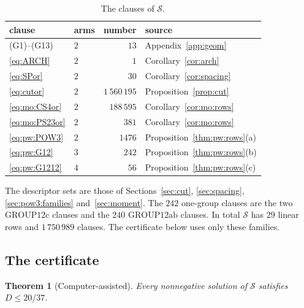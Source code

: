 \documentclass{amsart}
\newtheorem{theorem}{Theorem}
\theoremstyle{definition}
\theoremstyle{plain}
\numberwithin{equation}{section}
\numberwithin{table}{section}
\begin{document}
\begin{table}[ht]
\centering\small
\caption{The clauses of $\mathcal S$.}\label{tab:sys}
\begin{tabular}{@{}llrl@{}}
\hline clause & arms & number & source\\\hline
(G1)--(G13) & $2$ & $13$ & Appendix~\ref{app:geom}\\
\eqref{eq:ARCH} & $2$ & $1$ & Corollary~\ref{cor:arch}\\
\eqref{eq:SPor} & $2$ & $30$ & Corollary~\ref{cor:spacing}\\
\eqref{eq:cutor} & $2$ & $1\,560\,195$ & Proposition~\ref{prop:cut}\\
\eqref{eq:mo:CS4or} & $2$ & $188\,595$ & Corollary~\ref{cor:mo:rows}\\
\eqref{eq:mo:PS23or} & $2$ & $381$ & Corollary~\ref{cor:mo:rows}\\
\eqref{eq:pw:POW3} & $2$ & $1476$ & Proposition~\ref{thm:pw:rows}(a)\\
\eqref{eq:pw:G12} & $3$ & $242$ & Proposition~\ref{thm:pw:rows}(b)\\
\eqref{eq:pw:G1212} & $4$ & $56$ & Proposition~\ref{thm:pw:rows}(c)\\
\hline
\end{tabular}
\end{table}

The descriptor sets are those of Sections~\ref{sec:cut}, \ref{sec:spacing},
\ref{sec:pow3:families} and~\ref{sec:moment}. The $242$ one-group clauses are
the two $\mathrm{GROUP12c}$ clauses and the $240$ $\mathrm{GROUP12ab}$
clauses. In total $\mathcal S$ has $29$ linear rows and $1\,750\,989$ clauses.
The certificate below uses only these families.

\subsection{The certificate}

\begin{theorem}[Computer-assisted]\label{thm:cert}
Every nonnegative solution of $\mathcal S$ satisfies $D\le20/37$.
\end{theorem}
\end{document}
